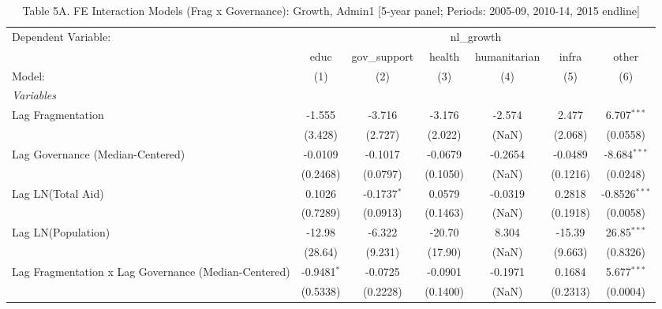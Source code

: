 \begin{table}[H]
   \caption{Table 5A. FE Interaction Models (Frag x Governance): Growth, Admin1 [5-year panel; Periods: 2005-09, 2010-14, 2015 endline]}
   \centering
   \begin{tabular}{lcccccc}
      \tabularnewline \midrule \midrule
      Dependent Variable: & \multicolumn{6}{c}{nl\_growth}\\
                                                           & educ          & gov\_support  & health   & humanitarian & infra    & other \\   
      Model:                                               & (1)           & (2)           & (3)      & (4)          & (5)      & (6)\\  
      \midrule
      \emph{Variables}\\
      Lag Fragmentation                                    & -1.555        & -3.716        & -3.176   & -2.574       & 2.477    & 6.707$^{***}$\\   
                                                           & (3.428)       & (2.727)       & (2.022)  & (NaN)        & (2.068)  & (0.0558)\\   
      Lag Governance (Median-Centered)                     & -0.0109       & -0.1017       & -0.0679  & -0.2654      & -0.0489  & -8.684$^{***}$\\   
                                                           & (0.2468)      & (0.0797)      & (0.1050) & (NaN)        & (0.1216) & (0.0248)\\   
      Lag LN(Total Aid)                                    & 0.1026        & -0.1737$^{*}$ & 0.0579   & -0.0319      & 0.2818   & -0.8526$^{***}$\\   
                                                           & (0.7289)      & (0.0913)      & (0.1463) & (NaN)        & (0.1918) & (0.0058)\\   
      Lag LN(Population)                                   & -12.98        & -6.322        & -20.70   & 8.304        & -15.39   & 26.85$^{***}$\\   
                                                           & (28.64)       & (9.231)       & (17.90)  & (NaN)        & (9.663)  & (0.8326)\\   
      Lag Fragmentation x Lag Governance (Median-Centered) & -0.9481$^{*}$ & -0.0725       & -0.0901  & -0.1971      & 0.1684   & 5.677$^{***}$\\   
                                                           & (0.5338)      & (0.2228)      & (0.1400) & (NaN)        & (0.2313) & (0.0004)\\   

\end{tabular}
\end{table}
